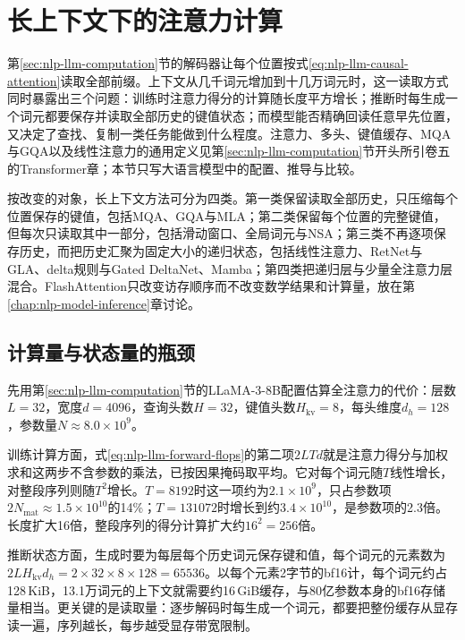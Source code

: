 \section{长上下文下的注意力计算}
\label{sec:nlp-llm-long-context}

第\ref{sec:nlp-llm-computation}节的解码器让每个位置按式\eqref{eq:nlp-llm-causal-attention}读取全部前缀。上下文从几千词元增加到十几万词元时，这一读取方式同时暴露出三个问题：训练时注意力得分的计算随长度平方增长；推断时每生成一个词元都要保存并读取全部历史的键值状态；而模型能否精确回读任意早先位置，又决定了查找、复制一类任务能做到什么程度。注意力、多头、键值缓存、MQA与GQA以及线性注意力的通用定义见第\ref{sec:nlp-llm-computation}节开头所引卷五的Transformer章；本节只写大语言模型中的配置、推导与比较。

按改变的对象，长上下文方法可分为四类。第一类保留读取全部历史，只压缩每个位置保存的键值，包括MQA、GQA与MLA；第二类保留每个位置的完整键值，但每次只读取其中一部分，包括滑动窗口、全局词元与NSA；第三类不再逐项保存历史，而把历史汇聚为固定大小的递归状态，包括线性注意力、RetNet与GLA、delta规则与Gated DeltaNet、Mamba；第四类把递归层与少量全注意力层混合。FlashAttention只改变访存顺序而不改变数学结果和计算量，放在第\ref{chap:nlp-model-inference}章讨论。

\subsection{计算量与状态量的瓶颈}
\label{sec:nlp-llm-context-bottlenecks}

先用第\ref{sec:nlp-llm-computation}节的LLaMA-3-8B配置估算全注意力的代价：层数$L=32$，宽度$d=4096$，查询头数$H=32$，键值头数$H_{\mathrm{kv}}=8$，每头维度$d_h=128$，参数量$N\approx8.0\times10^9$。

训练计算方面，式\eqref{eq:nlp-llm-forward-flops}的第二项$2LTd$就是注意力得分与加权求和这两步不含参数的乘法，已按因果掩码取平均。它对每个词元随$T$线性增长，对整段序列则随$T^2$增长。$T=8192$时这一项约为$2.1\times10^9$，只占参数项$2N_{\mathrm{mat}}\approx1.5\times10^{10}$的14\%；$T=131072$时增长到约$3.4\times10^{10}$，是参数项的2.3倍。长度扩大16倍，整段序列的得分计算扩大约$16^2=256$倍。

推断状态方面，生成时要为每层每个历史词元保存键和值，每个词元的元素数为$2LH_{\mathrm{kv}}d_h=2\times32\times8\times128=65536$。以每个元素2字节的bf16计，每个词元约占128\,KiB，13.1万词元的上下文就需要约16\,GiB缓存，与80亿参数本身的bf16存储量相当。更关键的是读取量：逐步解码时每生成一个词元，都要把整份缓存从显存读一遍，序列越长，每步越受显存带宽限制。

